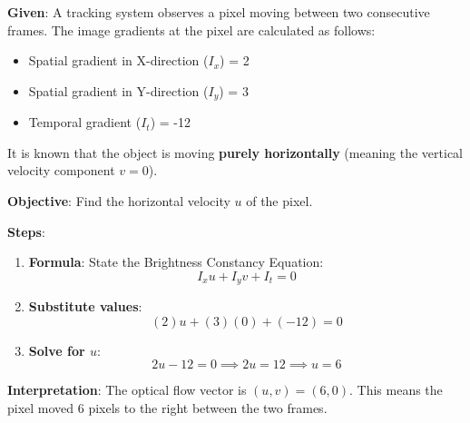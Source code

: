 \documentclass[11pt,a4paper]{article}
\begin{document}
\begin{tcolorbox}[colback=orange!5!white,colframe=orange!75!black,title=\textbf{Worked Example 16: Optical Flow (Brightness Constancy)}]
\textbf{Given}:
A tracking system observes a pixel moving between two consecutive frames. The image gradients at the pixel are calculated as follows:
\begin{itemize}
    \item Spatial gradient in X-direction ($I_x$) = 2
    \item Spatial gradient in Y-direction ($I_y$) = 3
    \item Temporal gradient ($I_t$) = -12
\end{itemize}
It is known that the object is moving \textbf{purely horizontally} (meaning the vertical velocity component $v = 0$).

\textbf{Objective}: Find the horizontal velocity $u$ of the pixel.

\textbf{Steps}:
\begin{enumerate}
    \item \textbf{Formula}: State the Brightness Constancy Equation:
    \[ I_x u + I_y v + I_t = 0 \]
    \item \textbf{Substitute values}:
    \[ (2)u + (3)(0) + (-12) = 0 \]
    \item \textbf{Solve for $u$}:
    \[ 2u - 12 = 0 \implies 2u = 12 \implies u = 6 \]
\end{enumerate}

\textbf{Interpretation}: The optical flow vector is $(u,v) = (6, 0)$. This means the pixel moved 6 pixels to the right between the two frames.
\end{tcolorbox}

\vspace{1em}
\end{document}
